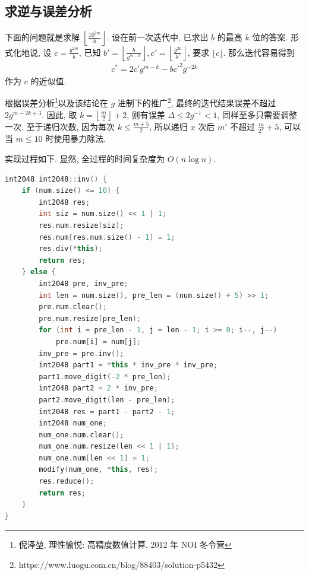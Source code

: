 \documentclass[UTF8, a4paper, 11pt]{ctexart}
\theoremstyle{definition}
\begin{document}
\subsection{求逆与误差分析}
下面的问题就是求解 $\left\lfloor\frac{10^{2m}}{b}\right\rfloor$. 设在前一次迭代中, 已求出 $b$ 的最高 $k$ 位的答案. 形式化地说, 设 $c=\frac {g^{2m}}b$, 已知 $b'=\left\lfloor\frac{b}{g^{m-k}}\right\rfloor,c'=\left\lfloor\frac {g^{2k}}{b'}\right\rfloor$, 要求 $\lfloor c\rfloor$. 那么迭代容易得到
\begin{align*}
    c^*=2c'g^{m-k}-bc'^2g^{-2k}
\end{align*}
作为 $c$ 的近似值.

根据误差分析\footnote{倪泽堃, 理性愉悦: 高精度数值计算, 2012 年 NOI 冬令营}以及该结论在 $g$ 进制下的推广\footnote{https://www.luogu.com.cn/blog/88403/solution-p5432}, 最终的迭代结果误差不超过 $2g^{m-2k+3}$. 因此, 取 $k=\left\lfloor\frac{m}{2}\right\rfloor+2$, 则有误差 $\Delta\le 2g^{-1}<1$, 同样至多只需要调整一次. 至于递归次数, 因为每次 $k\le \frac{m+5}2$, 所以递归 $x$ 次后 $m'$ 不超过 $\frac{m}{2^x}+5$, 可以当 $m\le 10$ 时使用暴力除法. 

实现过程如下. 显然, 全过程的时间复杂度为 $O(n\log n)$.

\begin{lstlisting}[language=C++]
int2048 int2048::inv() {
    if (num.size() <= 10) {
        int2048 res;
        int siz = num.size() << 1 | 1;
        res.num.resize(siz);
        res.num[res.num.size() - 1] = 1;
        res.div(*this);
        return res;
    } else {
        int2048 pre, inv_pre;
        int len = num.size(), pre_len = (num.size() + 5) >> 1;
        pre.num.clear();
        pre.num.resize(pre_len);
        for (int i = pre_len - 1, j = len - 1; i >= 0; i--, j--)
            pre.num[i] = num[j];
        inv_pre = pre.inv();
        int2048 part1 = *this * inv_pre * inv_pre;
        part1.move_digit(-2 * pre_len);
        int2048 part2 = 2 * inv_pre;
        part2.move_digit(len - pre_len);
        int2048 res = part1 - part2 - 1;
        int2048 num_one;
        num_one.num.clear();
        num_one.num.resize(len << 1 | 1);
        num_one.num[len << 1] = 1;
        modify(num_one, *this, res);
        res.reduce();
        return res;
    }
}
\end{lstlisting}
\end{document}
